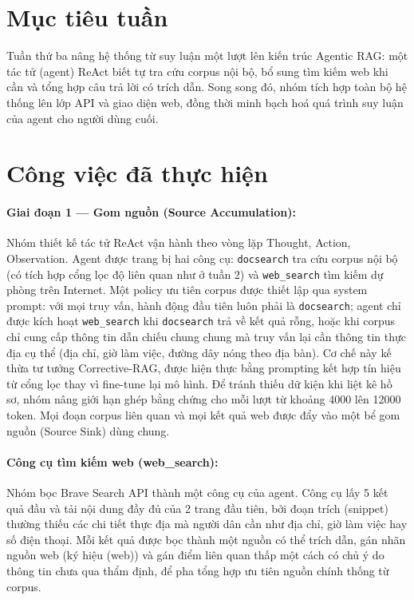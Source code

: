 \documentclass[11pt]{article}
\begin{document}

\section{Mục tiêu tuần}
Tuần thứ ba nâng hệ thống từ suy luận một lượt lên kiến trúc Agentic RAG: một tác tử (agent)
ReAct biết tự tra cứu corpus nội bộ, bổ sung tìm kiếm web khi cần và tổng hợp câu trả lời có
trích dẫn. Song song đó, nhóm tích hợp toàn bộ hệ thống lên lớp API và giao diện web, đồng
thời minh bạch hoá quá trình suy luận của agent cho người dùng cuối.

\section{Công việc đã thực hiện}

\paragraph{Giai đoạn 1 — Gom nguồn (Source Accumulation): }
Nhóm thiết kế tác tử ReAct vận hành theo vòng lặp Thought, Action, Observation. Agent được
trang bị hai công cụ: \texttt{docsearch} tra cứu corpus nội bộ (có tích hợp cổng lọc độ liên
quan như ở tuần 2) và \texttt{web\_search} tìm kiếm dự phòng trên Internet. Một policy ưu tiên
corpus được thiết lập qua system prompt: với mọi truy vấn, hành động đầu tiên luôn phải là
\texttt{docsearch}; agent chỉ được kích hoạt \texttt{web\_search} khi \texttt{docsearch} trả
về kết quả rỗng, hoặc khi corpus chỉ cung cấp thông tin dẫn chiếu chung chung mà truy vấn lại
cần thông tin thực địa cụ thể (địa chỉ, giờ làm việc, đường dây nóng theo địa bàn). Cơ chế này
kế thừa tư tưởng Corrective-RAG, được hiện thực bằng prompting kết hợp tín hiệu từ cổng lọc
thay vì fine-tune lại mô hình. Để tránh thiếu dữ kiện khi liệt kê hồ sơ, nhóm nâng giới hạn
ghép bằng chứng cho mỗi lượt từ khoảng 4000 lên 12000 token. Mọi đoạn corpus liên quan và mọi
kết quả web được đẩy vào một bể gom nguồn (Source Sink) dùng chung.

\paragraph{Công cụ tìm kiếm web (web\_search): }
Nhóm bọc Brave Search API thành một công cụ của agent. Công cụ lấy 5 kết quả đầu và tải nội
dung đầy đủ của 2 trang đầu tiên, bởi đoạn trích (snippet) thường thiếu các chi tiết thực địa
mà người dân cần như địa chỉ, giờ làm việc hay số điện thoại. Mỗi kết quả được bọc thành một
nguồn có thể trích dẫn, gán nhãn nguồn web (ký hiệu (web)) và gán điểm liên quan thấp một cách
có chủ ý do thông tin chưa qua thẩm định, để pha tổng hợp ưu tiên nguồn chính thống từ corpus.
\end{document}
